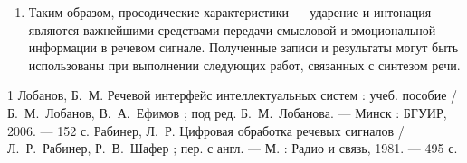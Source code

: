 \begin{enumerate}
	\item Таким образом, просодические характеристики --- ударение и
	интонация --- являются важнейшими средствами передачи смысловой и
	эмоциональной информации в речевом сигнале. Полученные записи и
	результаты могут быть использованы при выполнении следующих работ,
	связанных с синтезом речи.
\end{enumerate}

\begin{thebibliography}{1}
		Лобанов, Б.~М. Речевой интерфейс интеллектуальных систем :
		учеб. пособие / Б.~М.~Лобанов, В.~А.~Ефимов ; под ред.
		Б.~М.~Лобанова. --- Минск : БГУИР, 2006. --- 152 с.
		Рабинер, Л.~Р. Цифровая обработка речевых сигналов /
		Л.~Р.~Рабинер, Р.~В.~Шафер ; пер. с англ. --- М. : Радио и
		связь, 1981. --- 495 с.
\end{thebibliography}
